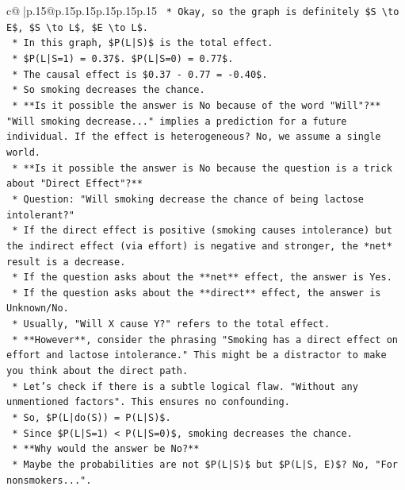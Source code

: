 \documentclass{article}
\begin{document}
{\begin{supertabular}{c@{$\;$}|p{.15\linewidth}@{}p{.15\linewidth}p{.15\linewidth}p{.15\linewidth}p{.15\linewidth}p{.15\linewidth}}
{{{\texttt{    *   Okay, so the graph is definitely \$S \textbackslash{}to E\$, \$S \textbackslash{}to L\$, \$E \textbackslash{}to L\$.} \\
\texttt{    *   In this graph, \$P(L|S)\$ is the total effect.} \\
\texttt{    *   \$P(L|S=1) = 0.37\$. \$P(L|S=0) = 0.77\$.} \\
\texttt{    *   The causal effect is \$0.37 {-} 0.77 = {-}0.40\$.} \\
\texttt{    *   So smoking decreases the chance.} \\
\texttt{    *   **Is it possible the answer is No because of the word "Will"?** "Will smoking decrease..." implies a prediction for a future individual. If the effect is heterogeneous? No, we assume a single world.} \\
\texttt{    *   **Is it possible the answer is No because the question is a trick about "Direct Effect"?**} \\
\texttt{        *   Question: "Will smoking decrease the chance of being lactose intolerant?"} \\
\texttt{        *   If the direct effect is positive (smoking causes intolerance) but the indirect effect (via effort) is negative and stronger, the *net* result is a decrease.} \\
\texttt{        *   If the question asks about the **net** effect, the answer is Yes.} \\
\texttt{        *   If the question asks about the **direct** effect, the answer is Unknown/No.} \\
\texttt{        *   Usually, "Will X cause Y?" refers to the total effect.} \\
\texttt{        *   **However**, consider the phrasing "Smoking has a direct effect on effort and lactose intolerance." This might be a distractor to make you think about the direct path.} \\
\texttt{        *   Let's check if there is a subtle logical flaw. "Without any unmentioned factors". This ensures no confounding.} \\
\texttt{        *   So, \$P(L|do(S)) = P(L|S)\$.} \\
\texttt{        *   Since \$P(L|S=1) < P(L|S=0)\$, smoking decreases the chance.} \\
\texttt{        *   **Why would the answer be No?**} \\
\texttt{        *   Maybe the probabilities are not \$P(L|S)\$ but \$P(L|S, E)\$? No, "For nonsmokers...".} \\
}}}
\end{supertabular}}
\end{document}
